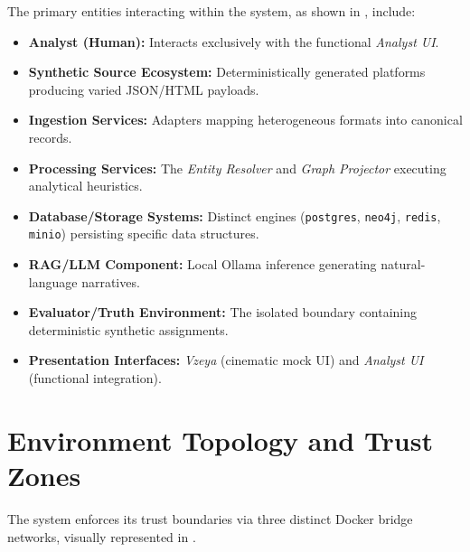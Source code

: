 The primary entities interacting within the system, as shown in , include:
\begin{itemize}
    \item \textbf{Analyst (Human):} Interacts exclusively with the functional \textit{Analyst UI}.
    \item \textbf{Synthetic Source Ecosystem:} Deterministically generated platforms producing varied JSON/HTML payloads.
    \item \textbf{Ingestion Services:} Adapters mapping heterogeneous formats into canonical records.
    \item \textbf{Processing Services:} The \textit{Entity Resolver} and \textit{Graph Projector} executing analytical heuristics.
    \item \textbf{Database/Storage Systems:} Distinct engines (\texttt{postgres}, \texttt{neo4j}, \texttt{redis}, \texttt{minio}) persisting specific data structures.
    \item \textbf{RAG/LLM Component:} Local Ollama inference generating natural-language narratives.
    \item \textbf{Evaluator/Truth Environment:} The isolated boundary containing deterministic synthetic assignments.
    \item \textbf{Presentation Interfaces:} \textit{Vzeya} (cinematic mock UI) and \textit{Analyst UI} (functional integration).
\end{itemize}

\section{Environment Topology and Trust Zones}
\label{sec:arch-topology}
The system enforces its trust boundaries via three distinct Docker bridge networks, visually represented in .

